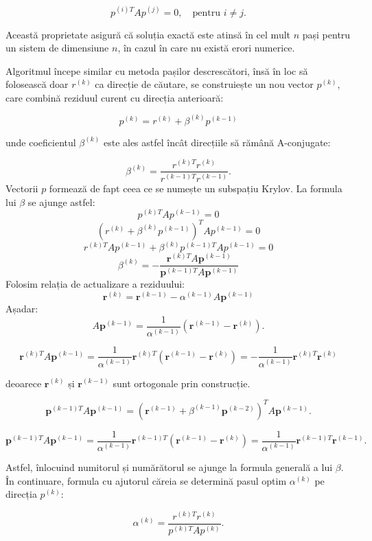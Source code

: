 \documentclass{exam}
\begin{document}
$$
p^{(i)T} A p^{(j)} = 0, \quad \text{pentru } i \neq j.
$$

Această proprietate asigură că soluția exactă este atinsă în cel mult $n$ pași pentru un sistem de dimensiune $n$, în cazul în care nu există erori numerice.

Algoritmul începe similar cu metoda pașilor descrescători, însă în loc să folosească doar $r^{(k)}$ ca direcție de căutare, se construiește un nou vector $p^{(k)}$, care combină reziduul curent cu direcția anterioară:

$$
p^{(k)} = r^{(k)} + \beta^{(k)} p^{(k-1)}
$$

unde coeficientul $\beta^{(k)}$ este ales astfel încât direcțiile să rămână A-conjugate:

$$
\beta^{(k)} = \frac{r^{(k)T} r^{(k)}}{r^{(k-1)T} r^{(k-1)}}.
$$
Vectorii $p$ formează de fapt ceea ce se numește un subspațiu Krylov.
La formula lui $\beta$ se ajunge astfel:
$$ p^{(k)T} A p^{(k-1)} = 0 $$
$$ (r^{(k)} + \beta ^{(k)}p^{(k-1)})^T A p^{(k-1)} = 0 $$
$$ r^{(k)T} A p^{(k-1)} + \beta ^{(k)}p^{(k-1)T} A p^{(k-1)} = 0 $$
$$\beta^{(k)} = -\frac{\mathbf{r}^{(k)T} A \mathbf{p}^{(k-1)}}{\mathbf{p}^{(k-1)T} A \mathbf{p}^{(k-1)}}
$$
Folosim relația de actualizare a reziduului:
$$\mathbf{r}^{(k)} = \mathbf{r}^{(k-1)} - \alpha^{(k-1)} A \mathbf{p}^{(k-1)}$$
Așadar:
$$A \mathbf{p}^{(k-1)} = \frac{1}{\alpha^{(k-1)}} (\mathbf{r}^{(k-1)} - \mathbf{r}^{(k)}).
$$

$$\mathbf{r}^{(k) T} A \mathbf{p}^{(k-1)} = \frac{1}{\alpha^{(k-1)}} \mathbf{r}^{(k) T} (\mathbf{r}^{(k-1)} - \mathbf{r}^{(k)}) = -\frac{1}{\alpha^{(k-1)}} \mathbf{r}^{(k) T} \mathbf{r}^{(k)}
$$

deoarece $\mathbf{r}^{(k)}$ și $\mathbf{r}^{(k-1)}$ sunt ortogonale prin construcție.

$$\mathbf{p}^{(k-1) T} A \mathbf{p}^{(k-1)} = (\mathbf{r}^{(k-1)} + \beta^{(k-1)} \mathbf{p}^{(k-2)})^{T} A \mathbf{p}^{(k-1)}.
$$

$$\mathbf{p}^{(k-1) T} A \mathbf{p}^{(k-1)} = \frac{1}{\alpha^{(k-1)}} \mathbf{r}^{(k-1) T} (\mathbf{r}^{(k-1)} - \mathbf{r}^{(k)}) = \frac{1}{\alpha^{(k-1)}} \mathbf{r}^{(k-1) T} \mathbf{r}^{(k-1)}.
$$

Astfel, înlocuind numitorul și numărătorul se ajunge la formula generală a lui $\beta$.
În continuare, formula cu ajutorul căreia se determină pasul optim $\alpha^{(k)}$ pe direcția $p^{(k)}$:

$$
\alpha^{(k)} = \frac{r^{(k)T} r^{(k)}}{p^{(k)T} A p^{(k)}}.
$$
\end{document}
